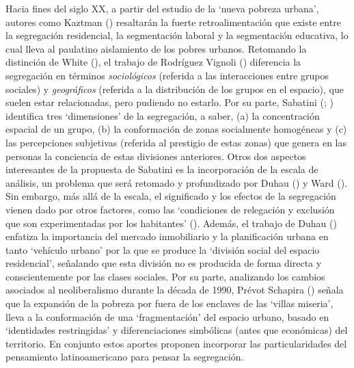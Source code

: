 \documentclass[
  spanish,
  a4paper,%
  chapterprefix=true,%
  DIV=calc,%
  twoside]{scrbook}%
\begin{document}
Hacia fines del siglo XX, a partir del estudio de
la `nueva pobreza urbana', autores como Kaztman () resaltarán la
fuerte retroalimentación que existe entre la segregación residencial, la
segmentación laboral y la segmentación educativa, lo cual lleva al
paulatino aislamiento de los pobres urbanos. Retomando la distinción de
White (), el trabajo de Rodríguez Vignoli () diferencia la
segregación en términos \emph{sociológicos} (referida a las interacciones
entre grupos sociales) y \emph{geográficos} (referida a la distribución de
los grupos en el espacio), que suelen estar relacionadas, pero pudiendo
no estarlo. Por su parte, Sabatini (; )
identifica tres `dimensiones' de la segregación, a saber, (a) la
concentración espacial de un grupo, (b) la conformación de zonas
socialmente homogéneas y (c) las percepciones subjetivas (referida al
prestigio de estas zonas) que genera en las personas la conciencia de
estas divisiones anteriores. Otros dos aspectos interesantes de la
propuesta de Sabatini es la incorporación de la escala de análisis, un
problema que será retomado y profundizado por Duhau () y Ward ().
Sin embargo, más allá de la escala, el significado y los efectos de la
segregación vienen dado por otros factores, como las `condiciones de
relegación y exclusión que son experimentadas por los habitantes'
(). Además, el trabajo de Duhau () enfatiza
la importancia del mercado inmobiliario y la planificación urbana en
tanto `vehículo urbano' por la que se produce la `división social del
espacio residencial', señalando que esta división no es producida de
forma directa y conscientemente por las clases sociales. Por su parte,
analizando los cambios asociados al neoliberalismo durante la década de
1990, Prévot Schapira () señala que la expansión de la pobreza por
fuera de los enclaves de las `villas miseria', lleva a la conformación
de una `fragmentación' del espacio urbano, basado en `identidades
restringidas' y diferenciaciones simbólicas (antes que económicas) del
territorio. En conjunto estos aportes proponen incorporar las
particularidades del pensamiento latinoamericano para pensar la
segregación.
\end{document}

